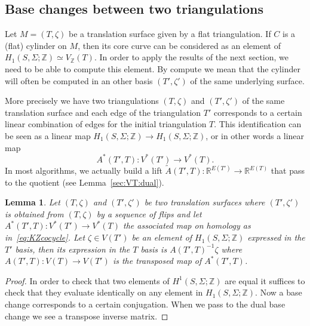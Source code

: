 \documentclass[a4paper,12pt]{article}
\def\bR{\mathbb{R}}
\def\bZ{\mathbb{Z}}
\newtheorem{lemma}[definition]{Lemma}
\begin{document}
\subsection{Base changes between two triangulations}
Let $M = (T, \zeta)$ be a translation surface given by a flat triangulation. If
$C$ is a (flat) cylinder on $M$, then its core curve can be considered as an
element of $H_1(S, \Sigma; \bZ) \simeq V_\bZ(T)$. In order to apply the
results of the next section, we need to be able to compute this element.
By compute we mean that the cylinder will often be computed in an other
basis $(T', \zeta')$ of the same underlying surface.

More precisely we have two triangulations $(T,\zeta)$ and $(T',\zeta')$ of the
same translation surface and each edge of the triangulation $T'$ corresponds to
a certain linear combination of edges for the initial triangulation $T$. This
identification can be seen as a linear map $H_1(S, \Sigma; \bZ) \to H_1(S,
\Sigma; \bZ)$, or in other words a linear map
\begin{equation}
\label{eq:KZcocycle}
A^*(T',T): V^*(T') \to V^*(T).
\end{equation}
In most algorithms, we actually build a lift $\widetilde{A}(T',T): \bR^{E(T')} \to \bR^{E(T)}$
that pass to the quotient (see Lemma~\ref{sec:VT:dual}).

\begin{lemma}
Let $(T, \zeta)$ and $(T', \zeta')$ be two translation surfaces where $(T',\zeta')$
is obtained from $(T,\zeta)$ by a sequence of flips and let $A^*(T',T): V^*(T') \to V^*(T)$
the associated map on homology as in~\eqref{eq:KZcocycle}. Let $\zeta \in V(T')$ be an element of $H_1(S, \Sigma; \bZ)$
expressed in the $T'$ basis, then its expression in the $T$ basis is
$A(T',T)^{-1} \zeta$ where $A(T',T): V(T) \to V(T')$ is the transposed map of $A^*(T',T)$.
\end{lemma}

\begin{proof}
In order to check that two elements of $H^1(S, \Sigma; \bZ)$ are equal it suffices to check
that they evaluate identically on any element in $H_1(S, \Sigma; \bZ)$. Now a base change
corresponds to a certain conjugation. When we pass to the dual base change we see
a transpose inverse matrix.
\end{proof}
\end{document}
